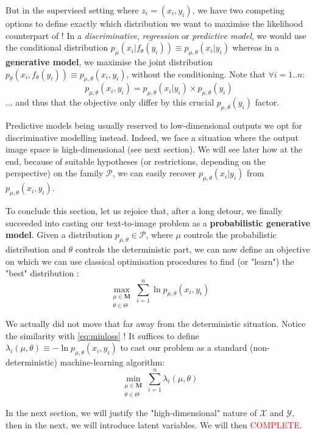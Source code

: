 \documentclass{article}
\begin{document}
\begin{appendix}
But in the supervised setting where $z_i=(x_i,y_i)$, we have two competing options to define exactly which distribution we want to maximise the likelihood counterpart of ! In a \textit{discriminative}, \textit{regression} or \textit{predictive model}, we would use the conditional distribution $p_{\mu}(x_i|f_\theta(y_i))\equiv p_{\mu,\theta}(x_i|y_i)$ whereas in a \textbf{generative model}, we maximise the joint distribution $p_\theta(x_i, f_\theta(y_i))\equiv p_{\mu,\theta}(x_i,y_i)$, without the conditioning. Note that $\forall i=1..n$: $$p_{\mu,\theta}(x_i, y_i)=p_{\mu,\theta}(x_i|y_i) \times p_{\mu,\theta}(y_i)$$ ... and thus that the objective only differ by this crucial $p_{\mu,\theta}(y_i)$ factor.

Predictive models being usually reserved to low-dimensional outputs \citep{probml-advanced}we opt for discriminative modelling instead. Indeed, we face a situation where the output image space is high-dimensional (see next section). We will see later how at the end, because of suitable hypotheses (or restrictions, depending on the perspective) on the family $\mathcal{P}$, we can easily recover $p_{\mu,\theta}(x_i|y_i)$ from $p_{\mu,\theta}(x_i,y_i)$.

To conclude this section, let us rejoice that, after a long detour, we finally succeeded into casting our  text-to-image problem as a \textbf{probabilistic generative model}. Given a distribution $p_{\mu,\theta}\in\mathcal{P}$, where $\mu$ controls the probabilistic distribution and $\theta$ controls the deterministic part, we can now define an objective on which we can use classical optimisation procedures to find (or "learn") the "best" distribution :
$$\max_{\substack{\mu\in\mathbf{M}\\\theta \in \Theta}} \sum_{i=1}^n \ln p_{\mu,\theta}(x_i,y_i)$$

We actually did not move that far away from the deterministic situation. Notice the similarity with \ref{eq:minloss} ! It suffices to define $\lambda_i(\mu,\theta)\equiv - \ln p_{\mu,\theta}(x_i,y_i)$ to cast our problem as a standard (non-deterministic) machine-learning algorithm:
$$\min_{\substack{\mu\in\mathbf{M}\\\theta \in \Theta}} \sum_{i=1}^n \lambda_i(\mu,\theta)$$

In the next section, we will justify the "high-dimensional" nature of $\mathcal{X}$ and $\mathcal{Y}$, then in the next, we will introduce latent variables. We will then \textcolor{red}{COMPLETE}.




\end{appendix}
\end{document}

